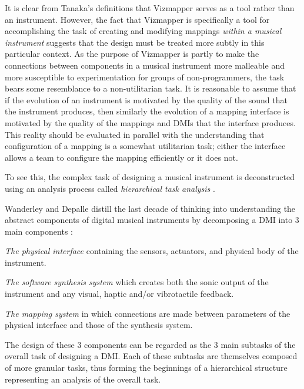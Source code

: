 It is clear from Tanaka's definitions that Vizmapper serves as a tool rather than an instrument. However, the fact that Vizmapper is specifically a tool for accomplishing the task of creating and modifying mappings \emph{within a musical instrument} suggests that the design must be treated more subtly in this particular context. As the purpose of Vizmapper is partly to make the connections between components in a musical instrument more malleable and more susceptible to experimentation for groups of non-programmers, the task bears some resemblance to a non-utilitarian task. It is reasonable to assume that if the evolution of an instrument is motivated by the quality of the sound that the instrument produces, then similarly the evolution of a mapping interface is motivated by the quality of the mappings and DMIs that the interface produces. This reality should be evaluated in parallel with the understanding that configuration of a mapping is a somewhat utilitarian task; either the interface allows a team to configure the mapping efficiently or it does not.

To see this, the complex task of designing a musical instrument is deconstructed using an analysis process called \emph{hierarchical task analysis} \cite{annett1967}. 

Wanderley and Depalle distill the last decade of thinking into understanding the abstract components of digital musical instruments by decomposing a DMI into 3 main components \cite{wanderley2004}:

\begin{description}
\item \emph{The physical interface} containing the sensors, actuators, and physical body of the instrument.
\item \emph{The software synthesis system} which creates both the sonic output of the instrument and any visual, haptic and/or vibrotactile feedback.
\item \emph{The mapping system} in which connections are made between parameters of the physical interface and those of the synthesis system.
\end{description}

The design of these 3 components can be regarded as the 3 main subtasks of the overall task of designing a DMI. Each of these subtasks are themselves composed of more granular tasks, thus forming the beginnings of a hierarchical structure representing an analysis of the overall task.

